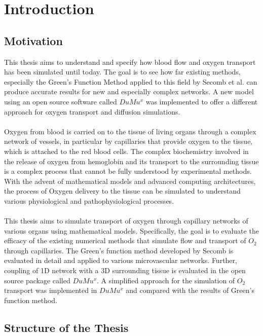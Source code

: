 
\section{Introduction}
\label{s:Introduction}

\subsection{Motivation}

This thesis aims to understand and specify how blood flow and oxygen transport has been simulated until today. The goal is to see how far existing methods, especially the Green's Function Method applied to this field by Secomb et al. \cite{Secomb2004} can produce accurate results for new and especially complex networks. A new model using an open source software called $DuMu^x$ \cite{flemischdumux} was implemented to offer a different approach for oxygen transport and diffusion simulations.\\
\\Oxygen from blood is carried on to the tissue of living organs through a
complex network of vessels, in particular by capillaries that provide oxygen to
the tissue, which is attached to the red blood cells. 
The complex biochemistry involved in the release of oxygen from hemoglobin and
its transport to the surrounding tissue is a complex process that cannot be
fully understood by experimental methods.
With the advent of mathematical models and advanced computing architectures,
the process of Oxygen delivery to the tissue can be simulated to understand
various physiological and pathophysiological processes.\\
\\This thesis aims to simulate transport of oxygen through capillary networks of
various organs using mathematical models.
Specifically, the goal is to evaluate the efficacy of the existing numerical
methods that simulate flow and transport of $O_2$ through capillaries.
The Green's function method developed by Secomb is evaluated in detail and
applied to various microvascular networks.
Further, coupling of 1D network with a 3D surrounding tissue is evaluated in
the open source package called $DuMu^x$.
A simplified approach for the simulation of $O_2$ transport was implemented in
 $DuMu^x$ and compared with the results of Green's function method.

\subsection{Structure of the Thesis}

